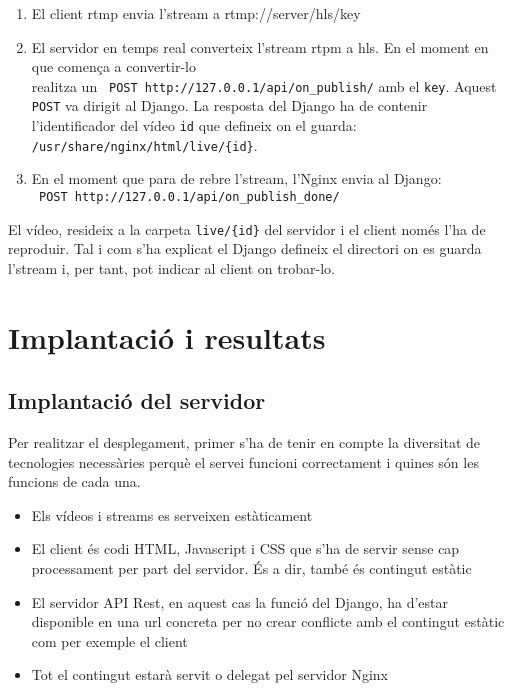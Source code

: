 \documentclass[12pt, titlepage]{article}
\begin{document}
\begin{enumerate}
\item El client rtmp envia l'stream a rtmp://server/hls/{key}
\item El servidor en temps real converteix l'stream rtpm a hls. En el moment en
que comença a convertir-lo \\ realitza un \verb| POST http://127.0.0.1/api/on_publish/|
amb el \verb|key|. Aquest \verb|POST| va dirigit al Django.
La resposta del Django ha de contenir l'identificador del vídeo \verb|id| que
defineix on el guarda: \\ \verb|/usr/share/nginx/html/live/{id}|.
\item En el moment que para de rebre l'stream, l'Nginx envia al Django: \\
\verb| POST http://127.0.0.1/api/on_publish_done/|
\end{enumerate}

El vídeo, resideix a la carpeta \verb|live/{id}| del servidor i el client només
l'ha de reproduir. Tal i com s'ha explicat el Django defineix el directori on es
guarda l'stream i, per tant, pot indicar al client on trobar-lo.

\section{Implantació i resultats}

\subsection{Implantació del servidor}

Per realitzar el desplegament, primer s'ha de tenir en compte la diversitat de
tecnologies necessàries perquè el servei funcioni correctament i quines són les
funcions de cada una.

\begin{itemize}

\item Els vídeos i streams es serveixen estàticament

\item El client és codi HTML, Javascript i CSS que s'ha de servir sense cap processament
per part del servidor. És a dir, també és contingut estàtic

\item El servidor API Rest, en aquest cas la funció del Django, ha d'estar
disponible en una url concreta per no crear conflicte amb el contingut estàtic
com per exemple el client

\item Tot el contingut estarà servit o delegat pel servidor Nginx

\end{itemize}
\end{document}
